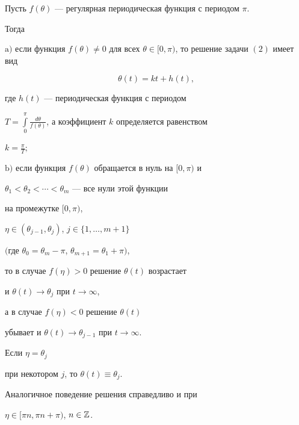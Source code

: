 \begin{thm}


Пусть $f(\theta)$ --- регулярная периодическая функция с периодом $\pi$.


Тогда





$\mathrm a)$ если функция $f(\theta) \ne 0$ для всех $\theta


\in [0,\pi)$, то решение задачи $(2)$ имеет вид


\begin{equation}


\theta (t)=kt+h(t),


\end{equation}


где $h(t)$ --- периодическая функция с периодом


$T=\int\limits_0^\pi {\frac{{d\theta}}


{{f(\theta)}}}$, а коэффициент $k$ определяется равенством


$k=\frac{\pi}{T};$





$\mathrm b)$ если функция $f(\theta)$ обращается в нуль на $[0,\pi)$ и


$\theta_1 < \theta_2 <\dotsb < \theta_m$ --- все нули этой функции


на промежутке $[0,\pi)$,


$\eta \in (\theta_{j - 1},\theta_j)$, $j \in \{1, \dotsc,m+1 \}$


$($где $\theta_0=\theta_m - \pi$, $\theta_{m+1}=\theta_1+\pi)$,


то в случае $f(\eta) > 0$ решение $\theta (t)$ возрастает


и $\theta (t) \to \theta_j$ при $t \to \infty$,


а в случае $f(\eta)<0$ решение $\theta (t)$


убывает и $\theta (t) \to \theta_{j - 1}$ при $t \to \infty $.


Если $\eta=\theta_j$


при некотором $j$, то $\theta (t) \equiv \theta_j$.


Аналогичное поведение решения справедливо и при


$\eta \in [\pi n,\pi n+\pi)$, $n \in {\Bbb Z}$. 


\end{thm} 





